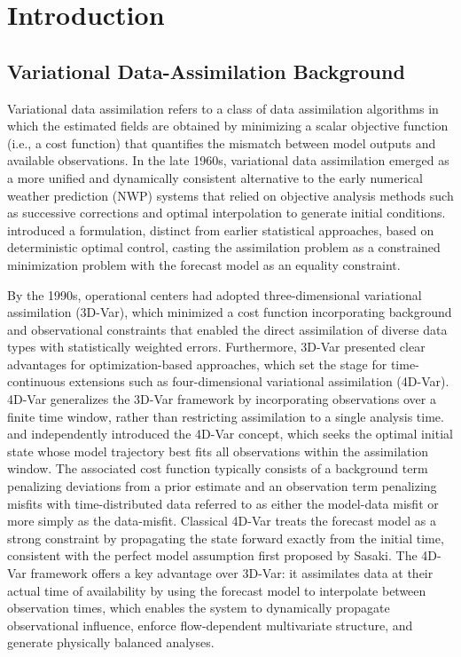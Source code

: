 \documentclass[final,1p,times]{elsarticle}
\begin{document}



\section{Introduction}\label{sec:intro}

    


\subsection{Variational Data-Assimilation Background}
Variational data assimilation refers to a class of data assimilation algorithms in which the estimated fields are obtained by minimizing a scalar objective function (i.e., a cost function) that quantifies the mismatch between model outputs and available observations. 
In the late 1960s, variational data assimilation emerged as a more unified and dynamically consistent alternative to the early numerical weather prediction (NWP) systems that relied on objective analysis methods such as successive corrections and optimal interpolation to generate initial conditions.  
\cite{Sasaki1970} introduced a formulation, distinct from earlier statistical approaches, based on deterministic optimal control, casting the assimilation problem as a constrained minimization problem with the forecast model as an equality constraint. 


By the 1990s, operational centers had adopted three-dimensional variational assimilation (3D-Var), which minimized a cost function incorporating background and observational constraints that enabled the direct assimilation of diverse data types with statistically weighted errors.
Furthermore, 3D-Var presented clear advantages for optimization-based approaches, which set the stage for time-continuous extensions such as four-dimensional variational assimilation (4D-Var). 
4D-Var generalizes the 3D-Var framework by incorporating observations over a finite time window, rather than restricting assimilation to a single analysis time. 
\cite{Dimet1986} and \cite{Lewis1985} independently introduced the 4D-Var concept, which seeks the optimal initial state whose model trajectory best fits all observations within the assimilation window. 
The associated cost function typically consists of a background term penalizing deviations from a prior estimate and an observation term penalizing misfits with time-distributed data referred to as either the model-data misfit or more simply as the data-misfit. 
Classical 4D-Var treats the forecast model as a strong constraint by propagating the state forward exactly from the initial time, consistent with the perfect model assumption first proposed by Sasaki. 
The 4D-Var framework offers a key advantage over 3D-Var: it assimilates data at their actual time of availability by using the forecast model to interpolate between observation times, which enables the system to dynamically propagate observational influence, enforce flow-dependent multivariate structure, and generate physically balanced analyses. 
\end{document}
